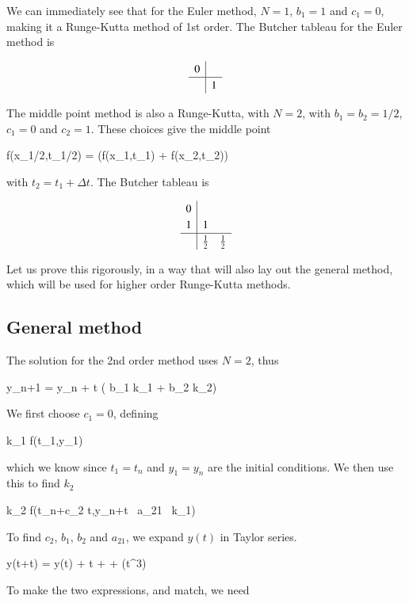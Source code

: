 We can immediately see that for the Euler method, $N=1$, $b_1 =1$ and
$c_1 = 0$, making it a Runge-Kutta method of 1st order. The Butcher tableau for the
Euler method is

\[
    \renewcommand\arraystretch{1.2}
\begin{array}
{c|c}
0 &  \\
\hline
  & 1
\end{array}
\]


The middle point method is also a Runge-Kutta, with $N=2$, with $b_1 = b_2 =
1/2$, $c_1 = 0$ and $c_2 = 1$. These choices give the middle point

\beq
f(x_{1/2},t_{1/2}) = \left(f(x_1,t_1) + f(x_2,t_2)\right)
\eeq

with $t_2 = t_1 + \Delta t$. The Butcher tableau is

\[
  \renewcommand\arraystretch{1.2}
  \begin{array}
{c|ccccc}
0\\
1& 1\\
\hline
  & \frac{1}{2} &\frac{1}{2}
\end{array}
\]

Let us prove this rigorously, in a way that will also lay out the
general method, which will be used for higher order Runge-Kutta
methods. 

\subsection{General method}

The solution for the 2nd order method uses $N=2$, thus

\beq
y_{n+1} = y_n + \Delta t  \left( b_1 k_1 + b_2 k_2\right)
\label{eq:expand}
\eeq

We first choose $c_1 = 0$, defining

\beq
k_1 \equiv f(t_1,y_1) 
\eeq

\noindent which we know since $t_1=t_n$ and $y_1=y_n$ are the initial conditions. We then use this to find $k_2$

\beq
k_2 \equiv f(t_n+c_2 \Delta t,y_n+\Delta t \ a_{21} \ k_1) 
\eeq


\noindent To find $c_2$, $b_1$, $b_2$ and $a_{21}$, we expand $y(t)$ in Taylor series.

\beq
y(t+\Delta t) = y(t) + \Delta t +
 +
(\Delta t^3) 
\label{eq:taylor}
\eeq

To make the two expressions,  and  match, we need

